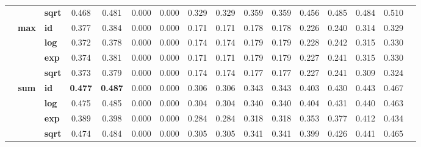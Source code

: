 \begin{table}[t]
{\begin{tabular}{cclccccccccccccc}
            & & \textbf{sqrt} & 0.468 & 0.481 & 0.000 & 0.000 & 0.329 & 0.329 & 0.359 & 0.359 & 0.456 & 0.485 & 0.484 & 0.510 \\
        \cmidrule{2-15}
        & \multirow{4}{*}{\textbf{max}}
              & \textbf{id}   & 0.377 & 0.384 & 0.000 & 0.000 & 0.171 & 0.171 & 0.178 & 0.178 & 0.226 & 0.240 & 0.314 & 0.329 \\
            & & \textbf{log}  & 0.372 & 0.378 & 0.000 & 0.000 & 0.174 & 0.174 & 0.179 & 0.179 & 0.228 & 0.242 & 0.315 & 0.330 \\
            & & \textbf{exp}  & 0.374 & 0.381 & 0.000 & 0.000 & 0.171 & 0.171 & 0.179 & 0.179 & 0.227 & 0.241 & 0.315 & 0.330 \\
            & & \textbf{sqrt} & 0.373 & 0.379 & 0.000 & 0.000 & 0.174 & 0.174 & 0.177 & 0.177 & 0.227 & 0.241 & 0.309 & 0.324 \\
        \cmidrule{2-15}
        & \multirow{4}{*}{\textbf{sum}}
              & \textbf{id}   & \textbf{0.477} & \textbf{0.487} & 0.000 & 0.000 & 0.306 & 0.306 & 0.343 & 0.343 & 0.403 & 0.430 & 0.443 & 0.467 \\
            & & \textbf{log}  & 0.475 & 0.485 & 0.000 & 0.000 & 0.304 & 0.304 & 0.340 & 0.340 & 0.404 & 0.431 & 0.440 & 0.463 \\
            & & \textbf{exp}  & 0.389 & 0.398 & 0.000 & 0.000 & 0.284 & 0.284 & 0.318 & 0.318 & 0.353 & 0.377 & 0.412 & 0.434 \\
            & & \textbf{sqrt} & 0.474 & 0.484 & 0.000 & 0.000 & 0.305 & 0.305 & 0.341 & 0.341 & 0.399 & 0.426 & 0.441 & 0.465 \\
        \midrule


\end{tabular}}
\end{table}
